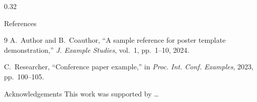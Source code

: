 \documentclass[final]{beamer}
\begin{document}
\begin{frame}{}
\begin{columns}[T]
\begin{column}{0.32\linewidth}
    \vspace{0.4cm}

    \begin{clsblock}{References}
      \begin{thebibliography}{9}
          A.~Author and B.~Coauthor,
          ``A sample reference for poster template demonstration,''
          \textit{J. Example Studies}, vol.~1, pp.~1--10, 2024.

          C.~Researcher,
          ``Conference paper example,''
          in \textit{Proc. Int. Conf. Examples}, 2023, pp.~100--105.
      \end{thebibliography}
    \end{clsblock}

    \vspace{0.4cm}

    \begin{clsblock}{Acknowledgements}
      This work was supported by \ldots
    \end{clsblock}
  \end{column}

\end{columns}

\posterfooter

\end{frame}
\end{document}
